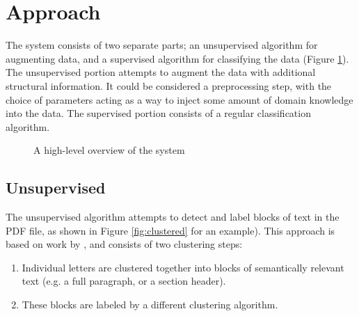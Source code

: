 \section*{Approach}

The system consists of two separate parts; an unsupervised algorithm for
augmenting data, and a supervised algorithm for classifying the data (Figure
\ref{fig:overview}). The unsupervised portion attempts to augment the data with
additional structural information. It could be considered a preprocessing step,
with the choice of parameters acting as a way to inject some amount of domain
knowledge into the data. The supervised portion consists of a regular
classification algorithm.

\begin{figure}[htbp]
  \centering
  \caption{A high-level overview of the system}
  \label{fig:overview}
\end{figure}

\subsection*{Unsupervised}
The unsupervised algorithm attempts to detect and label blocks of text in the
PDF file, as shown in Figure \ref{fig:clustered} for an example). This approach
is based on work by \textcite{klampfl2014unsupervised}, and consists of two
clustering steps:
\begin{enumerate}
\item Individual letters are clustered together into blocks of semantically
  relevant text (e.g. a full paragraph, or a section header).
\item These blocks are labeled by a different clustering algorithm.
\end{enumerate}

